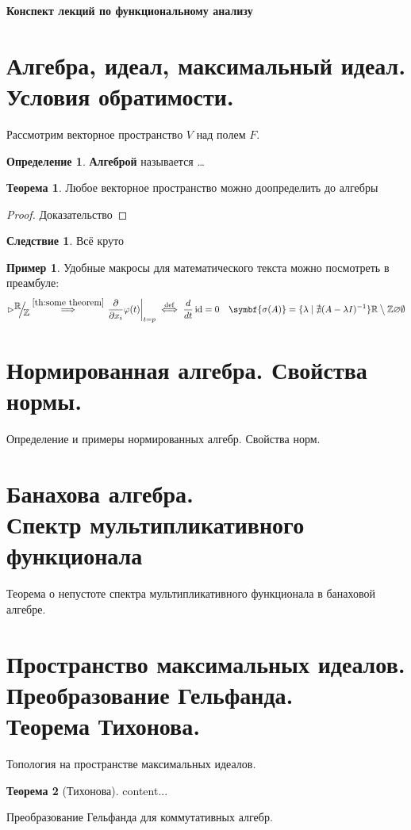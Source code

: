 \documentclass[12pt]{extarticle}
\renewcommand{\setminus}{\mathbin{\big\backslash}}%
\theoremstyle{definition}
\newtheorem{theorem}{\indent Теорема}[section]
\newtheorem{corollary}{\indent Следствие}%
\newtheorem{definition}{\indent Определение}[section]
\newtheorem{example}{\indent Пример}%
\newcommand{\factor}[2]{\raisebox{.35em}{$#1$}\kern-.27em\Big/\kern-.27em\raisebox{-.35em}{$#2$}}
\newcommand{\RR}{\mathbb{R}}
\newcommand{\ZZ}{\mathbb{Z}}
\newcommand{\bb}[1]{\mathbb{#1}}
\newcommand{\implby}[1]{\stackrel{\mathrm{#1}}{\implies}}
\newcommand{\ddt}{\frac{d}{dt}}
\newcommand{\iffdef}{\stackrel{\mathrm{def}}{\iff}}
\newcommand{\at}[2]{\left.#1\right\vert_{#2}}
\newcommand{\partiald}[2]{\frac{\partial #1}{\partial #2}}
\DeclareMathOperator{\id}{id}
\begin{document}
    \begin{titlepage}
        \null
        \vfill
        \centering\Huge\bfseries Конспект лекций по функциональному анализу
        \vfill
        \null
    \end{titlepage}
    \setcounter{page}{2}
    \tableofcontents
    \newpage
    \section[Алгебры, идеалы, условия обратимости.]{Алгебра, идеал, максимальный идеал.\\Условия обратимости.}
    Рассмотрим векторное пространство $V$ над полем $F$.
    \begin{definition}\label{def:Algebra}
        \textbf{Алгеброй} называется \dots
    \end{definition}
    \begin{theorem}\label{th:some theorem}
        Любое векторное пространство можно доопределить до алгебры
    \end{theorem}
    \begin{proof}
        Доказательство
    \end{proof}
    \begin{corollary}
        Всё круто
    \end{corollary}
    \begin{example}
        Удобные макросы для математического текста можно посмотреть в преамбуле:
        $$\rhd
        \factor{\RR}{\bb Z} \implby{\ref{th:some theorem}} \at{\partiald{}{x_i}\varphi(t)}{t=p} \iffdef \ddt\id=0 \quad \symbf{\sigma(A)} = \{\lambda\mid\nexists(A-\lambda I)^{-1}\} \RR\setminus\ZZ \varnothing \emptyset
        $$
    \end{example}
    \section[Нормы и нормированные алгебры]{Нормированная алгебра. Свойства нормы.}
        Определение и примеры нормированных алгебр. Свойства норм.

    \section[Банаховы алгебры. Спектр]{Банахова алгебра.\\Спектр мультипликативного функционала}
        Теорема о непустоте спектра мультипликативного функционала в банаховой алгебре.

    \section[Пространство максимальных идеалов]{Пространство максимальных идеалов. Преобразование Гельфанда.\\Теорема Тихонова.}
        Топология на пространстве максимальных идеалов.
        \begin{theorem}[Тихонова]\label{th:Tikhonov}
            content...
        \end{theorem}
        Преобразование Гельфанда для коммутативных алгебр.
\end{document}
